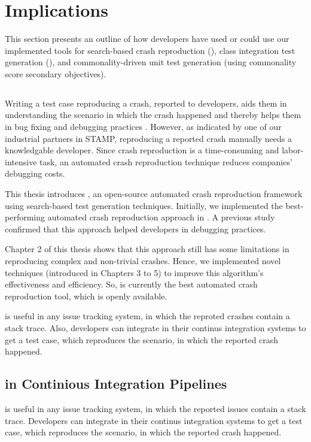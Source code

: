 \section{Implications}
This section presents an outline of how developers have used or could use our implemented tools for search-based crash reproduction (\botsing), class integration test generation (\cling), and commonality-driven unit test generation (using commonality score secondary objectives).

\subsection{\botsing}

Writing a test case reproducing a crash, reported to developers, aids them in understanding the scenario in which the crash happened and thereby helps them in bug fixing and debugging practices \cite{Zeller2009}. However, as indicated by one of our industrial partners in STAMP, reproducing a reported crash manually needs a knowledgable developer. Since crash reproduction is a time-consuming and labor-intensive task, an automated crash reproduction technique reduces companies' debugging costs.

This thesis introduces \botsing, an open-source automated crash reproduction framework using search-based test generation techniques. 
Initially, we implemented the best-performing automated crash reproduction approach \cite{Soltani2018a} in \botsing. A previous study confirmed that this approach helped developers in debugging practices.

Chapter 2 of this thesis shows that this approach still has some limitations in reproducing complex and non-trivial crashes. Hence, we implemented novel techniques (introduced in Chapters 3 to 5) to improve this algorithm's effectiveness and efficiency. So, \botsing is currently the best automated crash reproduction tool, which is openly available.


\botsing is useful in any issue tracking system, in which the reproted crashes contain a stack trace. Also, developers can integrate \botsing in their continus integration systems to get a test case, which reproduces the scenario, in which the reported crash happened.


\subsection{\botsing in Continious Integration Pipelines}
\botsing is useful in any issue tracking system, in which the reported issues contain a stack trace. Developers can integrate \botsing in their continus integration systems to get a test case, which reproduces the scenario, in which the reported crash happened.

